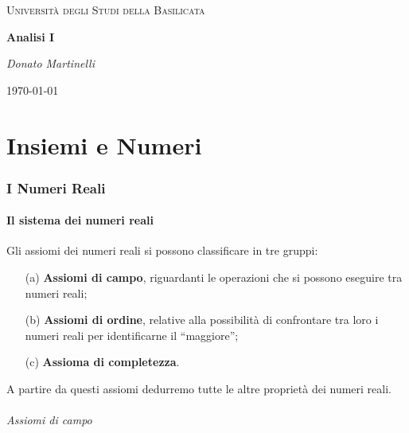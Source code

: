 \documentclass{article}
\theoremstyle{plain}
\theoremstyle{definition}
\theoremstyle{remark}
\begin{document}
\begin{titlepage}
    \centering
	{\textsc{Università degli Studi della Basilicata} \par}
	\vspace{2cm}
    {\huge\bfseries Analisi I\par}
    \vfill
	{\Large\itshape Donato Martinelli\par}
	{\large \today\par}
\end{titlepage}

\tableofcontents

\vspace{50pt}
\part{Insiemi e Numeri}
\vspace{50pt}
\section{I Numeri Reali}
\vspace{50pt}

\subsection{Il sistema dei numeri reali}
\vspace{10pt}

Gli assiomi dei numeri reali si possono classificare in tre gruppi:
\begin{enumerate}
    \item[(a)] \textbf{Assiomi di campo}, riguardanti le operazioni che si possono eseguire tra numeri reali;
    \item[(b)] \textbf{Assiomi di ordine}, relative alla possibilità di confrontare tra loro i numeri reali per identificarne il “maggiore”;
    \item[(c)] \textbf{Assioma di completezza}.
\end{enumerate}
A partire da questi assiomi dedurremo tutte le altre proprietà dei numeri reali.

\vspace{10pt}
\paragraph{Assiomi di campo}
\vspace{10pt}
\end{document}
